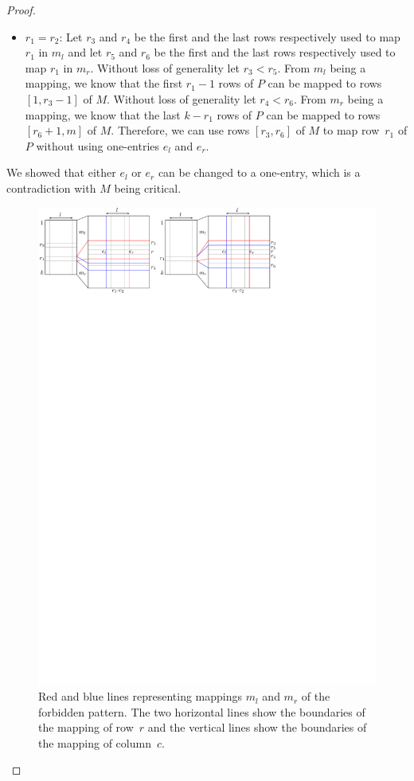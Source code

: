 \begin{proof}
\begin{itemize}
\begin{itemize}
		\item $r_1=r_2$: Let $r_3$ and $r_4$ be the first and the last rows respectively used to map $r_1$ in $m_l$ and let $r_5$ and $r_6$ be the first and the last rows respectively used to map $r_1$ in $m_r$. Without loss of generality let $r_3<r_5$. From $m_l$ being a mapping, we know that the first $r_1-1$ rows of $P$ can be mapped to rows $[1,r_3-1]$ of $M$. Without loss of generality let $r_4<r_6$. From $m_r$ being a mapping, we know that the last $k-r_1$ rows of $P$ can be mapped to rows $[r_6+1,m]$ of $M$. Therefore, we can use rows $[r_3,r_6]$ of $M$ to map row~$r_1$ of $P$ without using one-entries $e_l$ and $e_r$.
	\end{itemize}
\end{itemize}
We showed that either $e_l$ or $e_r$ can be changed to a one-entry, which is a contradiction with $M$ being critical.

\begin{figure}[!ht]
\centering
\includegraphics[width=\textwidth]{img/emptymidcol.pdf}
\caption{Red and blue lines representing mappings $m_l$ and $m_r$ of the forbidden pattern. The two horizontal lines show the boundaries of the mapping of row~$r$ and the vertical lines show the boundaries of the mapping of column~$c$.}
\label{fig:emptymid}
\end{figure}
\end{proof}

